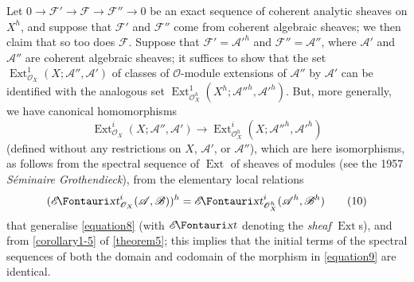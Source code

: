 \documentclass{article}
\theoremstyle{plain}
\theoremstyle{definition}
\newcommand{\sh}{\mathscr}
\newcommand{\shExt}{\sh{E}\textup{\kern-2.2pt{\Fontauri\slshape xt}}}
\newcommand{\Ext}{\operatorname{Ext}}
\begin{document}
Let $0\to\sh{F}'\to\sh{F}\to\sh{F}''\to0$ be an exact sequence of coherent analytic sheaves on $X^h$, and suppose that $\sh{F}'$ and $\sh{F}''$ come from coherent algebraic sheaves;
we then claim that so too does $\sh{F}$.
Suppose that $\sh{F}'=\sh{A}'^h$ and $\sh{F}''=\sh{A}''$, where $\sh{A}'$ and $\sh{A}''$ are coherent algebraic sheaves;
it suffices to show that the set $\Ext_{\sh{O}_X}^1(X;\sh{A}'',\sh{A}')$ of classes of $\sh{O}$-module extensions of $\sh{A}''$ by $\sh{A}'$ can be identified with the analogous set $\Ext_{\sh{O}_X^h}^1(X^h;\sh{A}''^h,\sh{A}'^h)$.
But, more generally, we have canonical homomorphisms
\[
\label{equation9}
  \Ext_{\sh{O}_X}^i(X;\sh{A}'',\sh{A}')
  \to 
  \Ext_{\sh{O}_X^h}^i(X;\sh{A}''^h,\sh{A}'^h)
  \tag{9}
\]
(defined without any restrictions on $X$, $\sh{A}'$, or $\sh{A}''$), which are here isomorphisms, as follows from the spectral sequence of $\Ext$ of sheaves of modules (see the 1957 \emph{Séminaire Grothendieck}), from the elementary local relations
\[
\label{equation10}
  (\shExt_{\sh{O}_X}^i(\sh{A},\sh{B}))^h
  = \shExt_{\sh{O}_X^h}^i(\sh{A}^h,\sh{B}^h)
  \tag{10}
\]
that generalise \cref{equation8} (with $\shExt$ denoting the \emph{sheaf} $\Ext$s), and from \cref{corollary1-5} of \cref{theorem5};
this implies that the initial terms of the spectral sequences of both the domain and codomain of the morphism in \cref{equation9} are identical.
\end{document}
